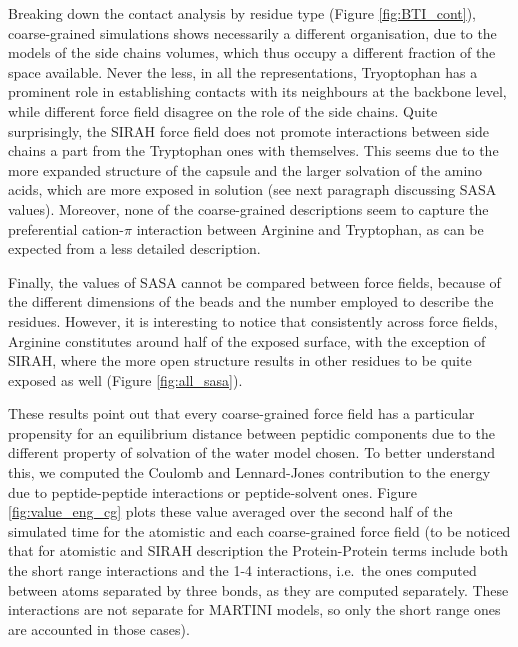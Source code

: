 Breaking down the contact analysis by residue type (Figure \ref{fig:BTI_cont}), coarse-grained simulations shows necessarily a different organisation, due to the models of the side chains volumes, which thus occupy a different fraction of the space available.
%
Never the less, in all the representations, Tryoptophan has a prominent role in establishing contacts with its neighbours at the backbone level, while different force field disagree on the role of the side chains. Quite surprisingly, the SIRAH force field does not promote interactions between side chains a part from the Tryptophan ones with themselves. This seems due to the more expanded structure of the capsule and the larger solvation of the amino acids, which are more exposed in solution (see next paragraph discussing SASA values).
%
Moreover, none of the coarse-grained descriptions seem to capture the preferential cation-$\pi$ interaction between Arginine and Tryptophan, as can be expected from a less detailed description.

Finally, the values of SASA cannot be compared between force fields, because of the different dimensions of the beads and the number employed to describe the residues. However, it is interesting to notice that consistently across force fields, Arginine constitutes around half of the exposed surface, with the exception of SIRAH, where the more open structure results in other residues to be quite exposed as well (Figure \ref{fig:all_sasa}).

These results point out that every coarse-grained force field has a particular propensity for an equilibrium distance between peptidic components due to the different property of solvation of the water model chosen. To better understand this, we computed the Coulomb and Lennard-Jones contribution to the energy due to peptide-peptide interactions or peptide-solvent ones.
%
Figure \ref{fig:value_eng_cg} plots these value averaged over the second half of the simulated time for the atomistic and each coarse-grained force field (to be noticed that for atomistic and SIRAH description the Protein-Protein terms include both the short range interactions and the 1-4 interactions, i.e.\ the ones computed between atoms separated by three bonds, as they are computed separately. These interactions are not separate for MARTINI models, so only the short range ones are accounted in those cases).

